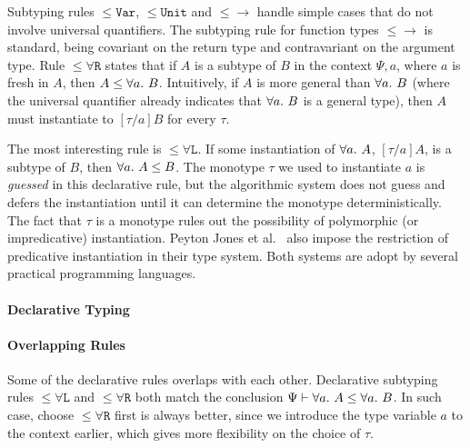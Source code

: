 Subtyping rules $\mathtt{{\le}Var}$, $\mathtt{{\le}Unit}$ and $\mathtt{{\le}{\to}}$
handle simple cases that do not involve universal quantifiers.
The subtyping rule for function types $\mathtt{{\le}{\to}}$ is standard,
being covariant on the return type and contravariant on the argument type.
Rule $\mathtt{{\le}\forall R}$ states that if $A$ is a subtype of $B$
in the context $\Psi, a$, where $a$ is fresh in $A$, then $A\le\all B$.
Intuitively, if $A$ is more general than $\all B$ (where the universal quantifier
already indicates that $\all B$ is a general type),
then $A$ must instantiate to $[\tau/a]B$ for every $\tau$.

The most interesting rule is $\mathtt{{\le}\forall L}$.
If some instantiation of $\all A$, $[\tau/a]A$, is a subtype of $B$,
then $\all A \le B$.
The monotype $\tau$ we used to instantiate $a$ is \emph{guessed} in this
declarative rule, but the algorithmic system does not guess and defers the
instantiation until it can determine the monotype deterministically.
The fact that $\tau$ is a monotype rules out the possibility of
polymorphic (or impredicative) instantiation.
Peyton Jones et al.~\cite{} also impose the restriction of
predicative instantiation in their type system.
Both systems are adopt by several practical programming languages.

\paragraph{Declarative Typing}

\paragraph{Overlapping Rules}
Some of the declarative rules overlaps with each other.
Declarative subtyping rules $\mathtt{{\le}\forall L}$ and $\mathtt{{\le}\forall R}$
both match the conclusion $\Psi\vdash \all A \le \all B$.
In such case, choose $\mathtt{{\le}\forall R}$ first is always better,
since we introduce the type variable $a$ to the context earlier,
which gives more flexibility on the choice of $\tau$.


